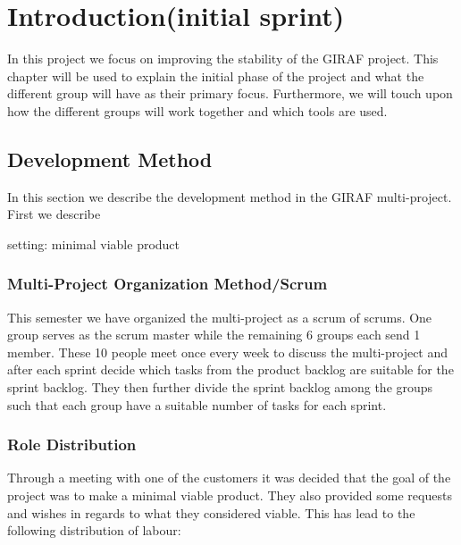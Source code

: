 \chapter{Introduction(initial sprint)}

In this project we focus on improving the stability of the GIRAF project. This
chapter will be used to explain the initial phase of the project and what the
different group will have as their primary focus. Furthermore, we will touch
upon how the different groups will work together and which tools are used.


\section{Development Method}
In this section we describe the development method in the GIRAF multi-project.
First we describe 



setting: minimal viable product



\subsection{Multi-Project Organization Method/Scrum}
 This semester we have organized the multi-project as a scrum of
scrums. One group serves as the scrum master while the remaining 6 groups each send 1
member. These 10 people meet once every week to discuss the multi-project
and after each sprint decide which tasks from the product backlog are suitable
for the sprint backlog. They then further divide the sprint backlog among the
groups such that each group have a suitable number of tasks for each sprint.\nl

\subsection{Role Distribution}

Through a meeting with one of the customers it was decided that the goal of the
project was to make a minimal viable product. They also provided some requests
and wishes in regards to what they considered viable. This has lead to the
following distribution of labour:

